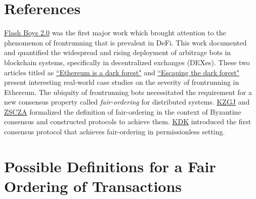 \documentclass{article}
\begin{document}
\section*{References}
\href{https://arxiv.org/abs/1904.05234}{Flash Boys 2.0} was the first major work which brought attention to the phenomenon of frontrunning that is prevalent in DeFi. This work documented and quantified the widespread and rising deployment of arbitrage bots in blockchain systems, specifically in decentralized exchanges (DEXes). These two articles titled as  \hyperlink{https://medium.com/@danrobinson/ethereum-is-a-dark-forest-ecc5f0505dff}{``Ethereum is a dark forest"} and \hyperlink{https://samczsun.com/escaping-the-dark-forest/}{``Escaping the dark forest"} present interesting real-world case studies on the severity of frontrunning in {\sf Ethereum}. The ubiquity of frontrunning bots necessitated the requirement for a new consensus property called {\em fair-ordering} for distributed systems. \hyperlink{https://eprint.iacr.org/2020/269.pdf}{KZGJ} and  \hyperlink{https://www.usenix.org/conference/osdi20/presentation/zhang-yunhao}{ZSCZA} formalized the definition of fair-ordering in the context of Byzantine consensus and constructed protocols to achieve them.  \hyperlink{https://eprint.iacr.org/2021/139.pdf}{KDK} introduced the first consensus protocol that achieves fair-ordering in permissionless setting.




%
%


\appendix
\section*{Possible Definitions for a Fair Ordering of Transactions}
 
\end{document}
